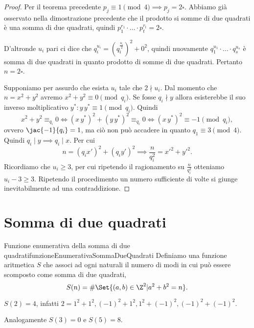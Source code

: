 \begin{proof}
	\graffito{\(\Leftarrow)\)}Per il teorema precedente \(p_j \equiv 1 \pmod{4} \implies p_j = 2\square\).
	Abbiamo già osservato nella dimostrazione precedente che il prodotto si somme di due quadrati è una somma di due quadrati, quindi \(p_1^{r_1} \cdot\ldots\cdot p_t^{r_t}=2\square\).

	D'altronde \(u_i\) pari ci dice che \(q_i^{u_i} = \left(q_i^{\frac{u_i}{2}}\right)^2+0^2\), quindi nuovamente \(q_1^{u_1} \cdot\ldots\cdot q_s^{u_s}\) è somma di due quadrati in quanto prodotto di somme di due quadrati.
	Pertanto \(n=2\square\).

	\graffito{\(\Rightarrow)\)}Supponiamo per assurdo che esista \(u_i\) tale che \(2\nmid u_i\).
	Dal momento che \(n=x^2+y^2\) avremo \(x^2+y^2 \equiv 0 \pmod{q_i}\).
	Se fosse \(q_i \nmid y\) allora esisterebbe il suo inverso moltiplicativo \(y^*: y\,y^* \equiv 1 \pmod{q_i}\).
	Quindi
	\[
		x^2+y^2 \equiv_{q_i} 0 \iff (x\,y^*)^2 + (y\,y^*)^2 \equiv_{q_i} 0 \iff (x\,y^*)^2 \equiv -1 \pmod{q_i},
	\]
	ovvero \(\jac{-1}{q_i} = 1\), ma ciò non può accadere in quanto \(q_1 \equiv 3 \pmod{4}\).
	Quindi \(q_i \mid y \implies q_i \mid x\). Per cui
	\[
		n = (q_i x')^2 + (q_i y')^2 \implies \frac{n}{q_i^2} = x'^2 + y'^2.
	\]
	Ricordiamo che \(u_i\ge 3\), per cui ripetendo il ragionamento su \(\frac{n}{q_i^2}\) otteniamo \(u_i-3 \ge 3\).
	Ripetendo il procedimento un numero sufficiente di volte si giunge inevitabilmente ad una contraddizione.
\end{proof}
%
%
\section{Somma di due quadrati}

\begin{defn}{Funzione enumerativa della somma di due quadrati}{funzioneEnumerativaSommaDueQuadrati}
	Definiamo una funzione aritmetica \(S\) che associ ad ogni naturali il numero di modi in cui può essere scomposto come somma di due quadrati,
	\[
		S(n) = \#\Set{(a,b)\in\Z^2 | a^2+b^2=n}.
	\]
\end{defn}

\begin{ese}
	\(S(2)=4\), infatti \(2=1^2+1^2,(-1)^2+1^2,1^2+(-1)^2,(-1)^2+(-1)^2\).

	Analogamente \(S(3)=0\) e \(S(5)=8\).
\end{ese}

